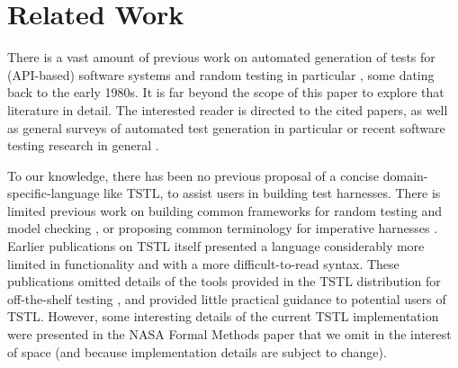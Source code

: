 \section{Related Work}

There is a vast amount of previous work on automated generation of
tests for (API-based) software systems
\cite{Pacheco,FA11,GodefroidKS05} and random testing in particular
\cite{ICSEDiff,Pacheco,AMFL11,ARTChen,ISSTAART,FASE,HamletOnly,Hamlet94,ClaessenH00,CiupaLOM07,RandFormal,woda08,andrews-etal-rute-rt,ASE08,evalrand},
some dating back to the early 1980s. It is far beyond the scope of
this paper to explore that literature in detail.  The interested
reader is directed to the cited papers, as well as general surveys of
automated test generation in particular \cite{anand2013orchestrated}
or recent software testing research in general \cite{orsofuse}.  



To our knowledge, there has been no previous proposal of a concise
domain-specific-language \cite{Fow10} like TSTL, to assist users in building test
harnesses.  There is limited previous work on
building common frameworks for random testing and model checking
\cite{woda08}, or proposing common terminology for imperative
harnesses \cite{woda12}.  Earlier publications on TSTL itself \cite{NFM15,ISSTA15} presented a
language considerably more limited in functionality and with a more
difficult-to-read syntax.  These publications omitted details of the tools provided in the TSTL distribution for
off-the-shelf testing \cite{tstl}, and provided little practical
guidance to potential users of TSTL.  However, some interesting
details of the current TSTL implementation were presented in the NASA
Formal Methods paper \cite{NFM15} that we omit in
the interest of space (and because implementation details are subject
to change).

